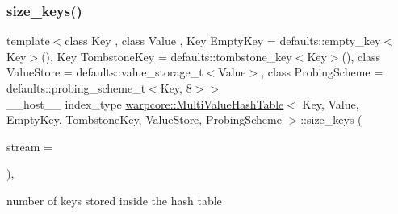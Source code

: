 \subsubsection{\texorpdfstring{size\+\_\+keys()}{size\_keys()}}
{\footnotesize\ttfamily template$<$class Key , class Value , Key Empty\+Key = defaults\+::empty\+\_\+key$<$\+Key$>$(), Key Tombstone\+Key = defaults\+::tombstone\+\_\+key$<$\+Key$>$(), class Value\+Store  = defaults\+::value\+\_\+storage\+\_\+t$<$\+Value$>$, class Probing\+Scheme  = defaults\+::probing\+\_\+scheme\+\_\+t$<$\+Key, 8$>$$>$ \\
\+\_\+\+\_\+host\+\_\+\+\_\+ index\+\_\+type \hyperlink{classwarpcore_1_1MultiValueHashTable}{warpcore\+::\+Multi\+Value\+Hash\+Table}$<$ Key, Value, Empty\+Key, Tombstone\+Key, Value\+Store, Probing\+Scheme $>$\+::size\+\_\+keys (\begin{DoxyParamCaption}\item[{cuda\+Stream\+\_\+t}]{stream = {} }\end{DoxyParamCaption})\hspace{0.3cm}{\ttfamily [inline]}, {\ttfamily [noexcept]}}



number of keys stored inside the hash table 


